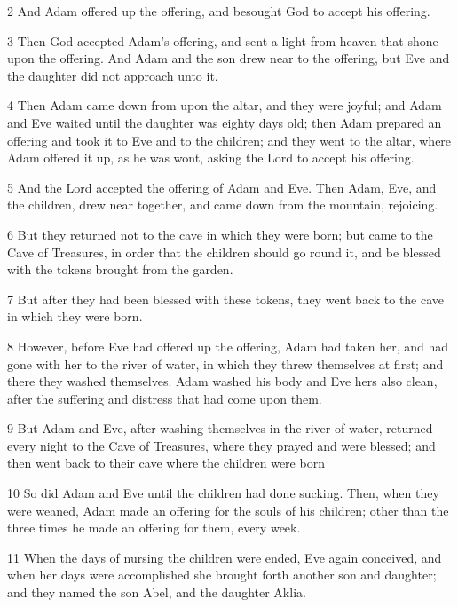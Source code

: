 \par 2 And Adam offered up the offering, and besought God to accept his offering.

\par 3 Then God accepted Adam's offering, and sent a light from heaven that shone upon the offering. And Adam and the son drew near to the offering, but Eve and the daughter did not approach unto it.

\par 4 Then Adam came down from upon the altar, and they were joyful; and Adam and Eve waited until the daughter was eighty days old; then Adam prepared an offering and took it to Eve and to the children; and they went to the altar, where Adam offered it up, as he was wont, asking the Lord to accept his offering.

\par 5 And the Lord accepted the offering of Adam and Eve. Then Adam, Eve, and the children, drew near together, and came down from the mountain, rejoicing.

\par 6 But they returned not to the cave in which they were born; but came to the Cave of Treasures, in order that the children should go round it, and be blessed with the tokens brought from the garden.

\par 7 But after they had been blessed with these tokens, they went back to the cave in which they were born.

\par 8 However, before Eve had offered up the offering, Adam had taken her, and had gone with her to the river of water, in which they threw themselves at first; and there they washed themselves. Adam washed his body and Eve hers also clean, after the suffering and distress that had come upon them.

\par 9 But Adam and Eve, after washing themselves in the river of water, returned every night to the Cave of Treasures, where they prayed and were blessed; and then went back to their cave where the children were born

\par 10 So did Adam and Eve until the children had done sucking. Then, when they were weaned, Adam made an offering for the souls of his children; other than the three times he made an offering for them, every week.

\par 11 When the days of nursing the children were ended, Eve again conceived, and when her days were accomplished she brought forth another son and daughter; and they named the son Abel, and the daughter Aklia.

